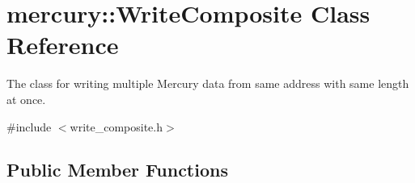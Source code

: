 \hypertarget{classmercury_1_1_write_composite}{}\section{mercury\+:\+:Write\+Composite Class Reference}
\label{classmercury_1_1_write_composite}


The class for writing multiple Mercury data from same address with same length at once.  




{\ttfamily \#include $<$write\+\_\+composite.\+h$>$}

\subsection*{Public Member Functions}
